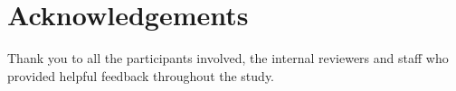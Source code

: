 \documentclass{scaffold/sigchi}
\begin{document}


\section{Acknowledgements}
Thank you to all the participants involved, the internal reviewers and staff who provided helpful feedback throughout the study.

\balance{}





\end{document}
